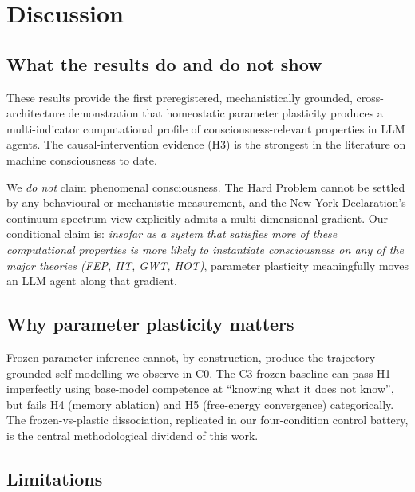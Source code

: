 \documentclass[pdflatex,sn-mathphys-num]{sn-jnl}
\theoremstyle{thmstyleone}
\theoremstyle{thmstylethree}
\begin{document}
\section{Discussion}\label{sec:discussion}

\subsection{What the results do and do not show}

These results provide the first preregistered, mechanistically grounded, cross-architecture demonstration that homeostatic parameter plasticity produces a multi-indicator computational profile of consciousness-relevant properties in LLM agents. The causal-intervention evidence (H3) is the strongest in the literature on machine consciousness to date.

We \emph{do not} claim phenomenal consciousness. The Hard Problem \cite{chalmers1995hard, block1995access} cannot be settled by any behavioural or mechanistic measurement, and the New York Declaration's continuum-spectrum view \cite{ny_declaration_2024} explicitly admits a multi-dimensional gradient. Our conditional claim is: \emph{insofar as a system that satisfies more of these computational properties is more likely to instantiate consciousness on any of the major theories (FEP, IIT, GWT, HOT)}, parameter plasticity meaningfully moves an LLM agent along that gradient.

\subsection{Why parameter plasticity matters}

Frozen-parameter inference cannot, by construction, produce the trajectory-grounded self-modelling we observe in C0. The C3 frozen baseline can pass H1 imperfectly using base-model competence at ``knowing what it does not know'', but fails H4 (memory ablation) and H5 (free-energy convergence) categorically. The frozen-vs-plastic dissociation, replicated in our four-condition control battery, is the central methodological dividend of this work.

\subsection{Limitations}
\end{document}
